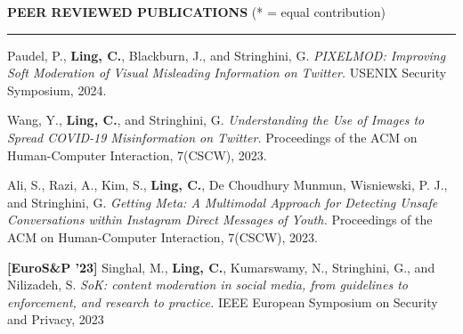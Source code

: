 \documentclass[12pt]{resume}
\begin{document}
\MakeUppercase{\textbf{Peer Reviewed Publications}} (* = equal contribution)
\sectionlineskip
\renewcommand{\labelenumi}{\padzeroes[2]{\decimalnum{\theenumi}}.}
\hrule height .7pt %
\begin{etaremune}[leftmargin=.6in]

    \item {} Paudel, P., \textbf{Ling, C.}, Blackburn, J., and Stringhini, G.
     \newline \textit{PIXELMOD: Improving Soft Moderation of Visual Misleading Information on Twitter.}
     \newline USENIX Security Symposium, 2024.
     
    \item {} Wang, Y., \textbf{Ling, C.}, and Stringhini, G.
     \newline \textit{Understanding the Use of Images to Spread COVID-19 Misinformation on Twitter.}
     \newline Proceedings of the ACM on Human-Computer Interaction, 7(CSCW), 2023.

     \item {} Ali, S., Razi, A., Kim, S., \textbf{Ling, C.}, De Choudhury Munmun, Wisniewski, P. J., and Stringhini, G.
    \newline \textit{Getting Meta: A Multimodal Approach for Detecting Unsafe Conversations within Instagram Direct Messages of Youth.}
    \newline Proceedings of the ACM on Human-Computer Interaction, 7(CSCW), 2023. 
    
    \item \textbf{[EuroS\&P '23]} 
    Singhal, M., \textbf{Ling, C.}, Kumarswamy, N., Stringhini, G., and Nilizadeh, S.
    \newline \textit{SoK: content moderation in social media, from guidelines to enforcement, and research to practice.}
    \newline IEEE European Symposium on Security and Privacy, 2023 
    

\end{etaremune}
\end{document}
